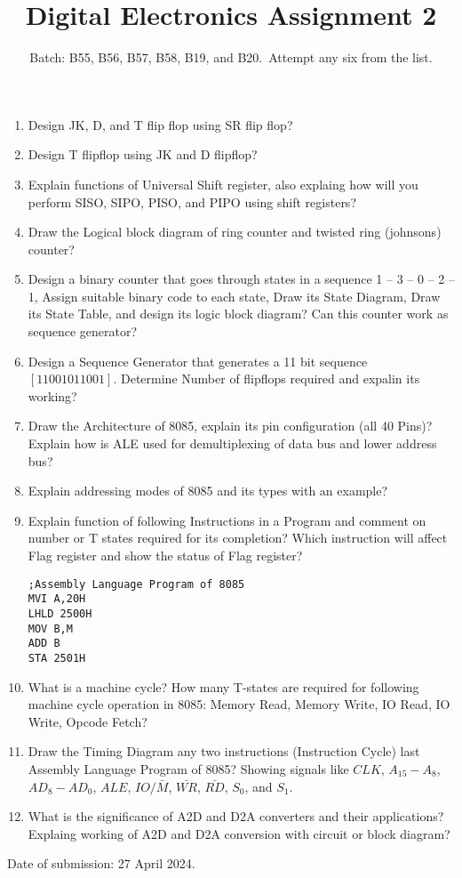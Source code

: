 \documentclass[a4paper,12pt,two column]{article}
\author{Batch: B55, B56, B57, B58, B19, and B20.\ \hfill Attempt any six from the list.}
\title{Digital Electronics Assignment 2}
\begin{document}
\maketitle
\begin{enumerate}
\item Design JK, D, and T flip flop using SR flip flop?
\item Design T flipflop using JK and D flipflop?
\item Explain functions of Universal Shift register, also explaing how will you perform SISO, SIPO, PISO, and PIPO using shift registers? 
 \item Draw the Logical block diagram of ring counter and twisted ring (johnsons) counter?
\item Design a binary counter that goes through states in a sequence 1 -- 3 -- 0 -- 2 -- 1, Assign suitable binary code to each state, Draw its State Diagram, Draw its State Table, and design its logic block diagram? Can this counter work as sequence generator?
\item Design a Sequence Generator that generates a 11 bit sequence $[11001011001]$. Determine Number of flipflops required and expalin its working?


\item Draw the Architecture of 8085, explain its pin configuration (all 40 Pins)? Explain how is ALE used for demultiplexing of data bus and lower address bus? 

\item Explain addressing modes of 8085 and its types with an example?
\item Explain function of following Instructions in a Program and comment on number or T states required for its completion? Which instruction will affect Flag register and show the status of Flag register?
\begin{verbatim}
;Assembly Language Program of 8085
MVI A,20H
LHLD 2500H
MOV B,M
ADD B
STA 2501H
\end{verbatim}
\item What is a machine cycle? How many T-states are required for following machine cycle operation in 8085: Memory Read, Memory Write, IO Read, IO Write, Opcode Fetch? 
\item Draw the Timing Diagram any two instructions (Instruction Cycle) last Assembly Language Program of 8085? Showing signals like $CLK$, $A_{15}-A_{8}$, $AD_8-AD_0$, $ALE$, $IO/\bar{M}$, $\bar{WR}$, $\bar{RD}$, $S_0$, and $S_1$. 

\item What is the significance of A2D and D2A converters and their applications? Explaing working of A2D and D2A conversion with circuit or block diagram?  
\end{enumerate}
\vspace{3em}

\hfill Date of submission: 27 April 2024.
\end{document}

